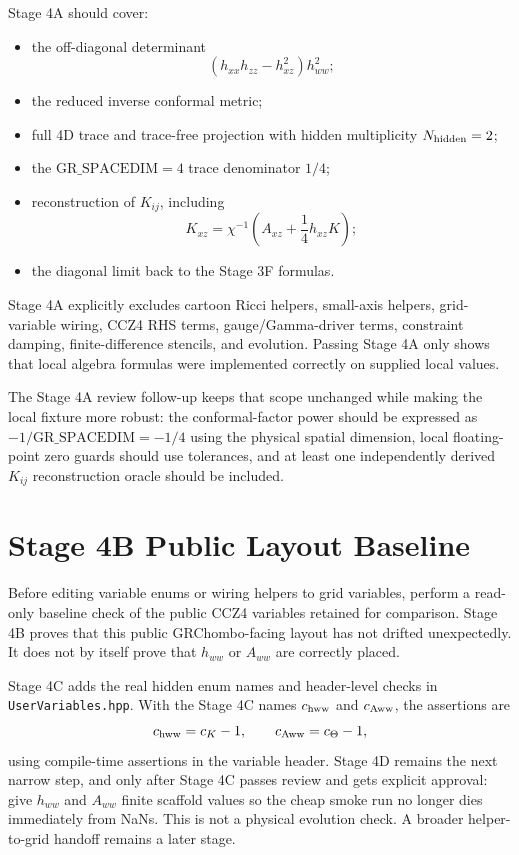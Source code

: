 \documentclass[11pt]{article}
\begin{document}
Stage 4A should cover:

\begin{itemize}[leftmargin=2em]
\item the off-diagonal determinant
  \[
    (h_{xx}h_{zz}-h_{xz}^{2})h_{ww}^{2};
  \]
\item the reduced inverse conformal metric;
\item full 4D trace and trace-free projection with hidden multiplicity
  \(N_{\rm hidden}=2\);
\item the \(\mathrm{GR\_SPACEDIM}=4\) trace denominator \(1/4\);
\item reconstruction of \(K_{ij}\), including
  \[
    K_{xz}
    =
    \chi^{-1}\left(A_{xz}+\frac14 h_{xz}K\right);
  \]
\item the diagonal limit back to the Stage 3F formulas.
\end{itemize}

Stage 4A explicitly excludes cartoon Ricci helpers, small-axis helpers,
grid-variable wiring, CCZ4 RHS terms, gauge/Gamma-driver terms, constraint
damping, finite-difference stencils, and evolution. Passing Stage 4A only shows
that local algebra formulas were implemented correctly on supplied local
values.

The Stage 4A review follow-up keeps that scope unchanged while making the
local fixture more robust: the conformal-factor power should be expressed as
\(-1/\mathrm{GR\_SPACEDIM}=-1/4\) using the physical spatial dimension, local
floating-point zero guards should use tolerances, and at least one
independently derived \(K_{ij}\) reconstruction oracle should be included.

\section{Stage 4B Public Layout Baseline}

Before editing variable enums or wiring helpers to grid variables, perform a
read-only baseline check of the public CCZ4 variables retained for comparison.
Stage 4B proves that this public GRChombo-facing layout has not drifted
unexpectedly. It does not by itself prove that \(h_{ww}\) or \(A_{ww}\) are
correctly placed.

Stage 4C adds the real hidden enum names and header-level checks in
\texttt{UserVariables.hpp}. With the Stage 4C names \(c_{\rm hww}\) and
\(c_{\rm Aww}\), the assertions are
\[
  c_{\rm hww}=c_K-1,\qquad c_{\rm Aww}=c_\Theta-1,
\]
using compile-time assertions in the variable header. Stage 4D remains the
next narrow step, and only after Stage 4C passes review and gets explicit
approval: give \(h_{ww}\) and \(A_{ww}\) finite scaffold values so the cheap
smoke run no longer dies immediately from NaNs. This is not a physical
evolution check. A broader helper-to-grid handoff remains a later stage.
\end{document}
